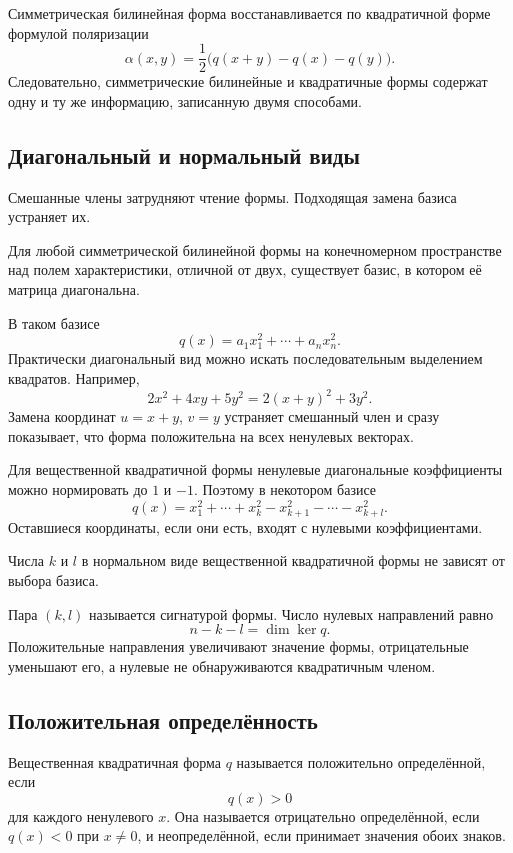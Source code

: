 Симметрическая билинейная форма восстанавливается по квадратичной форме формулой поляризации
\[
\alpha(x,y)
=
\frac12\bigl(q(x+y)-q(x)-q(y)\bigr).
\]
Следовательно, симметрические билинейные и квадратичные формы содержат одну и ту же информацию, записанную двумя способами.

\subsection{Диагональный и нормальный виды}

Смешанные члены затрудняют чтение формы. Подходящая замена базиса устраняет их.

\begin{theorem}
Для любой симметрической билинейной формы на конечномерном пространстве над полем характеристики, отличной от двух, существует базис, в котором её матрица диагональна.
\end{theorem}

В таком базисе
\[
q(x)=a_1x_1^2+\cdots+a_nx_n^2.
\]
Практически диагональный вид можно искать последовательным выделением квадратов. Например,
\[
2x^2+4xy+5y^2
=
2(x+y)^2+3y^2.
\]
Замена координат $u=x+y$, $v=y$ устраняет смешанный член и сразу показывает, что форма положительна на всех ненулевых векторах.

Для вещественной квадратичной формы ненулевые диагональные коэффициенты можно нормировать до $1$ и $-1$. Поэтому в некотором базисе
\[
q(x)
=
x_1^2+\cdots+x_k^2
-x_{k+1}^2-\cdots-x_{k+l}^2.
\]
Оставшиеся координаты, если они есть, входят с нулевыми коэффициентами.

\begin{theorem}
Числа $k$ и $l$ в нормальном виде вещественной квадратичной формы не зависят от выбора базиса.
\end{theorem}

Пара $(k,l)$ называется сигнатурой формы. Число нулевых направлений равно
\[
n-k-l=\dim\ker q.
\]
Положительные направления увеличивают значение формы, отрицательные уменьшают его, а нулевые не обнаруживаются квадратичным членом.

\subsection{Положительная определённость}

\begin{definition}
Вещественная квадратичная форма $q$ называется положительно определённой, если
\[
q(x)>0
\]
для каждого ненулевого $x$. Она называется отрицательно определённой, если $q(x)<0$ при $x\neq0$, и неопределённой, если принимает значения обоих знаков.
\end{definition}

